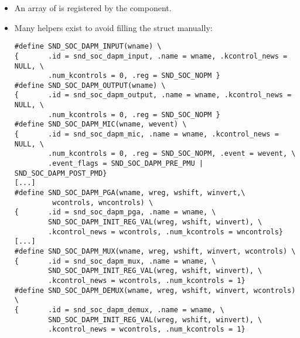 \begin{frame}[fragile]{}
  \begin{itemize}
  \item An array of  is registered
    by the component.
  \item Many helpers exist to avoid filling the struct manually:
  \begin{block}{}
    \fontsize{8}{7}\selectfont
    \begin{verbatim}
#define SND_SOC_DAPM_INPUT(wname) \
{       .id = snd_soc_dapm_input, .name = wname, .kcontrol_news = NULL, \
        .num_kcontrols = 0, .reg = SND_SOC_NOPM }
#define SND_SOC_DAPM_OUTPUT(wname) \
{       .id = snd_soc_dapm_output, .name = wname, .kcontrol_news = NULL, \
        .num_kcontrols = 0, .reg = SND_SOC_NOPM }
#define SND_SOC_DAPM_MIC(wname, wevent) \
{       .id = snd_soc_dapm_mic, .name = wname, .kcontrol_news = NULL, \
        .num_kcontrols = 0, .reg = SND_SOC_NOPM, .event = wevent, \
        .event_flags = SND_SOC_DAPM_PRE_PMU | SND_SOC_DAPM_POST_PMD}
[...]
#define SND_SOC_DAPM_PGA(wname, wreg, wshift, winvert,\
         wcontrols, wncontrols) \
{       .id = snd_soc_dapm_pga, .name = wname, \
        SND_SOC_DAPM_INIT_REG_VAL(wreg, wshift, winvert), \
        .kcontrol_news = wcontrols, .num_kcontrols = wncontrols}
[...]
#define SND_SOC_DAPM_MUX(wname, wreg, wshift, winvert, wcontrols) \
{       .id = snd_soc_dapm_mux, .name = wname, \
        SND_SOC_DAPM_INIT_REG_VAL(wreg, wshift, winvert), \
        .kcontrol_news = wcontrols, .num_kcontrols = 1}
#define SND_SOC_DAPM_DEMUX(wname, wreg, wshift, winvert, wcontrols) \
{       .id = snd_soc_dapm_demux, .name = wname, \
        SND_SOC_DAPM_INIT_REG_VAL(wreg, wshift, winvert), \
        .kcontrol_news = wcontrols, .num_kcontrols = 1}
    \end{verbatim}
  \end{block}
  \end{itemize}
\end{frame}

